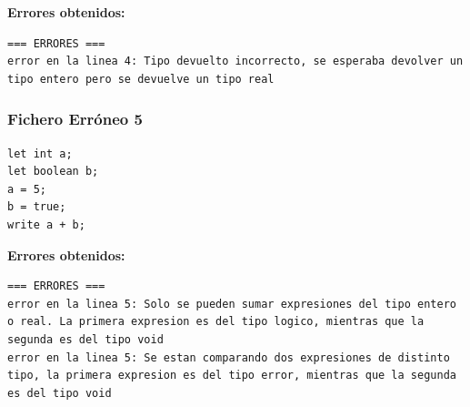 \documentclass{article}
\begin{document}
\textbf{Errores obtenidos:}
\begin{lstlisting}
=== ERRORES ===
error en la linea 4: Tipo devuelto incorrecto, se esperaba devolver un tipo entero pero se devuelve un tipo real
\end{lstlisting}

\subsubsection{Fichero Erróneo 5}
\begin{lstlisting}[title={fichero5\_erroneo.txt}]
let int a;
let boolean b;
a = 5;
b = true;
write a + b;
\end{lstlisting}

\textbf{Errores obtenidos:}
\begin{lstlisting}
=== ERRORES ===
error en la linea 5: Solo se pueden sumar expresiones del tipo entero o real. La primera expresion es del tipo logico, mientras que la segunda es del tipo void
error en la linea 5: Se estan comparando dos expresiones de distinto tipo, la primera expresion es del tipo error, mientras que la segunda es del tipo void
\end{lstlisting}
\end{document}
